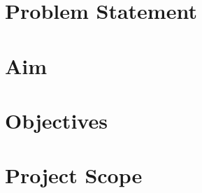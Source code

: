 \documentclass[a4paper, 12pt]{extreport}
\begin{document}
		
		\section{Problem Statement}
			
		
		\section{Aim}
		
		
		\section{Objectives}
		
		
		\section{Project Scope}
			
		
\end{document}
